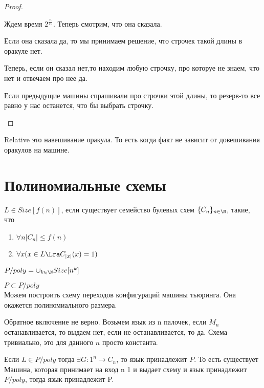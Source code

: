 \begin{proof}
\begin{enumerate}
	Ждем время $2^{\frac{n}{10}}$. Теперь смотрим, что она сказала. 
	
	Если она сказала да, то мы принимаем решение, что строчек такой длины в оракуле нет. 
	
	Теперь, если он сказал нет,то находим любую строчку, про которуе не знаем, что нет и отвечаем про нее да. 
	
	Если предыдущие машины спрашивали про строчки этой длины, то резерв-то все равно у нас останется, что бы выбрать строчку.  
\end{enumerate}
\end{proof}

\begin{Def}
	Relative это навешивание оракула. То есть когда факт не зависит от довешивания оракулов на машине. 
\end{Def}

\section{Полиномиальные схемы}
\begin{Def}
	$L \in Size[f(n)]$, если существует семейство булевых схем $\{C_n\}_{n \in \N}$, такие, что 
	\begin{enumerate}
	\item $\forall n |C_n| \le f(n)$\\
	\item $\forall x(x \in L \Lra C_{|x|}(x) = 1)$
\end{enumerate}
\end{Def}

\begin{Def}
	$P/poly = \cup_{k \in \N}Size[n^k]$
\end{Def}

\begin{Rem}
	$P \subset P/poly$\\
	Можем построить схему переходов конфигураций машины тьюринга. Она окажется полиномиального размера. 
\end{Rem}
\begin{Rem}
	Обратное включение не верно. Возьмем язык из n палочек, если $M_n$ останавливается, 
	то выдаем нет, если не останавливается, то да. Схема тривиально, это для данного $n$ просто константа. 
\end{Rem}

\begin{Rem}
	Если $L \in P/poly$ тогда $\exists G \colon 1^n \to C_n$, то язык принадлежит $P$. То есть существует Машина, 
	которая принимает на вход n 1 и выдает схему и язык принадлежит $P/poly$, тогда язык принадлежит P. 
\end{Rem}

